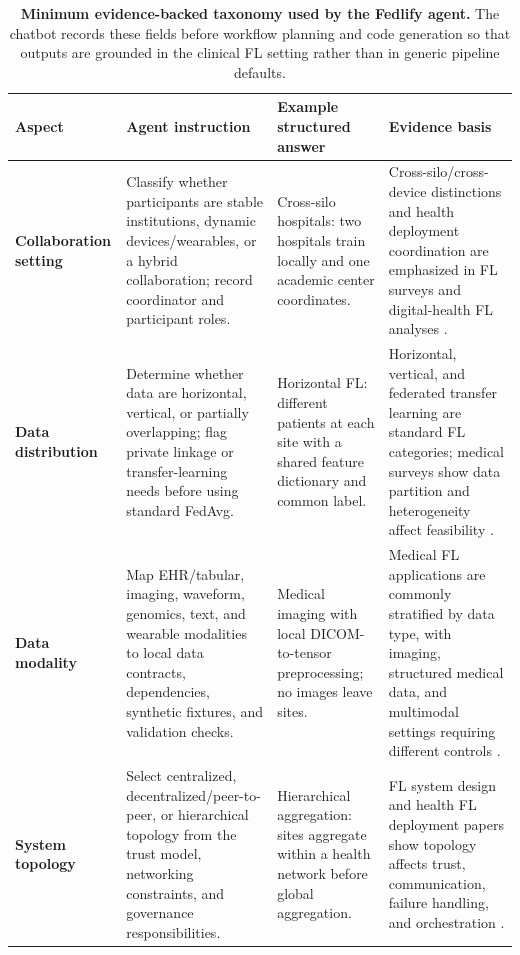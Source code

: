 \documentclass[preprint,5p, 10pt, times]{elsarticle}
\begin{document}
\begin{table}[t]
\centering
\caption{\textbf{Minimum evidence-backed taxonomy used by the Fedlify agent.} The chatbot records these fields before workflow planning and code generation so that outputs are grounded in the clinical FL setting rather than in generic pipeline defaults.}
\label{tab:fedlify_agent_taxonomy}
\tiny
\setlength{\tabcolsep}{3pt}
\renewcommand{\arraystretch}{1.16}
\begin{tabularx}{\textwidth}{
>{\raggedright\arraybackslash}p{2.6cm}
>{\raggedright\arraybackslash}X
>{\raggedright\arraybackslash}X
>{\raggedright\arraybackslash}X}
\toprule
\textbf{Aspect} & \textbf{Agent instruction} & \textbf{Example structured answer} & \textbf{Evidence basis} \\
\midrule
\textbf{Collaboration setting}
& Classify whether participants are stable institutions, dynamic devices/wearables, or a hybrid collaboration; record coordinator and participant roles.
& Cross-silo hospitals: two hospitals train locally and one academic center coordinates.
& Cross-silo/cross-device distinctions and health deployment coordination are emphasized in FL surveys and digital-health FL analyses \cite{kairouz2021advances,rieke2020future,eden2025scoping}. \\

\textbf{Data distribution}
& Determine whether data are horizontal, vertical, or partially overlapping; flag private linkage or transfer-learning needs before using standard FedAvg.
& Horizontal FL: different patients at each site with a shared feature dictionary and common label.
& Horizontal, vertical, and federated transfer learning are standard FL categories; medical surveys show data partition and heterogeneity affect feasibility \cite{yang2019federated,teo2024federated,choi2024survey}. \\

\textbf{Data modality}
& Map EHR/tabular, imaging, waveform, genomics, text, and wearable modalities to local data contracts, dependencies, synthetic fixtures, and validation checks.
& Medical imaging with local DICOM-to-tensor preprocessing; no images leave sites.
& Medical FL applications are commonly stratified by data type, with imaging, structured medical data, and multimodal settings requiring different controls \cite{choi2024survey,guan2024federated,kaissis2020secure}. \\

\textbf{System topology}
& Select centralized, decentralized/peer-to-peer, or hierarchical topology from the trust model, networking constraints, and governance responsibilities.
& Hierarchical aggregation: sites aggregate within a health network before global aggregation.
& FL system design and health FL deployment papers show topology affects trust, communication, failure handling, and orchestration \cite{kairouz2021advances,bonawitz2019towards,rieke2020future}. \\


\end{tabularx}
\end{table}
\end{document}
